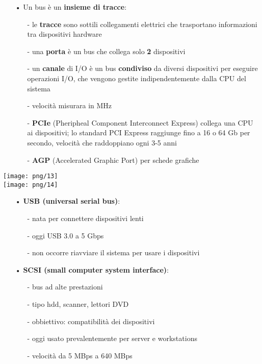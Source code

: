 \documentclass[12pt, letterpaper]{article}
\begin{document}
\begin{itemize}
   \item[•] Un bus è un \textbf{insieme di tracce}:
      \begin{itemize}
         \item[-] le \textbf{tracce} sono sottili collegamenti elettrici che trasportano informazioni tra dispositivi hardware
         \item[-] una \textbf{porta} è un bus che collega solo \textbf{2} dispositivi
         \item[-] un \textbf{canale} di I/O è un bus \textbf{condiviso} da diversi dispositivi per eseguire operazioni I/O, che vengono gestite indipendentemente dalla CPU del sistema 
         \item[-] velocità misurara in MHz
         \item[-] \textbf{PCIe} (Pheripheal Component Interconnect Express) collega una CPU ai dispositivi; lo standard PCI Express raggiunge fino a 16 o 64 Gb per secondo, velocità che raddoppiano ogni 3-5 anni
         \item[-] \textbf{AGP} (Accelerated Graphic Port) per schede grafiche
      \end{itemize} 
\end{itemize}
\texttt{[image: png/13]}
\\
\texttt{[image: png/14]}
\\
\newpage
\begin{itemize}
   \item[•] \textbf{USB (universal serial bus)}:
      \begin{itemize}
         \item[-] nata per connettere dispositivi lenti
         \item[-] oggi USB 3.0 a 5 Gbps
         \item[-] non occorre riavviare il sistema per usare i dispositivi
      \end{itemize}
   \item[•] \textbf{SCSI (small computer system interface)}:
      \begin{itemize}
         \item[-] bus ad alte prestazioni 
         \item[-] tipo hdd, scanner, lettori DVD
         \item[-] obbiettivo: compatibilità dei dispositivi
         \item[-] oggi usato prevalentemente per server e workstations
         \item[-] velocità da 5 MBps a 640 MBps
      \end{itemize}
\end{itemize}
\end{document}
